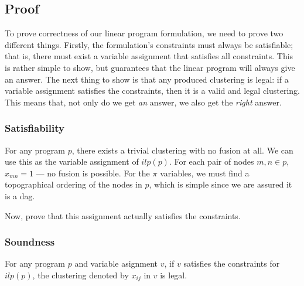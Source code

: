 \subsection{Proof}
To prove correctness of our linear program formulation, we need to prove two different things.
Firstly, the formulation's constraints must always be satisfiable; that is, there must exist a variable assignment that satisfies all constraints.
This is rather simple to show, but guarantees that the linear program will always give an answer.
The next thing to show is that any produced clustering is legal: if a variable assignment satisfies the constraints, then it is a valid and legal clustering.
This means that, not only do we get \emph{an} answer, we also get the \emph{right} answer.

\subsubsection{Satisfiability}
For any program $p$, there exists a trivial clustering with no fusion at all.
We can use this as the variable assignment of $ilp(p)$.
For each pair of nodes $m,n \in p$, $x_{mn} = 1$ --- no fusion is possible.
For the $\pi$ variables, we must find a topographical ordering of the nodes in $p$, which is simple since we are assured it is a dag.

Now, prove that this assignment actually satisfies the constraints.


\subsubsection{Soundness}
For any program $p$ and variable asignment $v$, if $v$ satisfies the constraints for $ilp(p)$, the clustering denoted by $x_{ij}$ in $v$ is legal.

